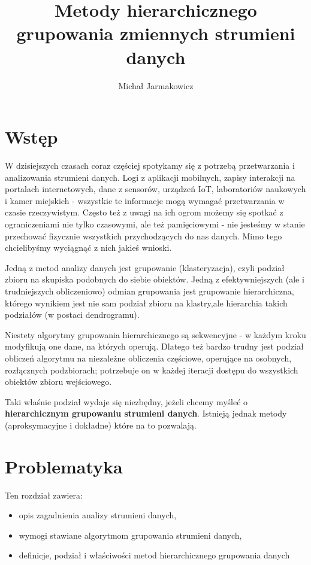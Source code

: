 \documentclass[11pt]{mgr}
\begin{document}
\author{Michał Jarmakowicz}
\title{ Metody hierarchicznego grupowania zmiennych strumieni danych}
\maketitle
\newpage
\tableofcontents
\newpage
\chapter{Wstęp}

W dzisiejszych czasach coraz częściej spotykamy się z potrzebą przetwarzania i analizowania strumieni danych. Logi z aplikacji mobilnych, zapisy interakcji na portalach internetowych, dane z sensorów, urządzeń IoT, laboratoriów naukowych i kamer miejskich - wszystkie te informacje mogą wymagać przetwarzania w czasie rzeczywistym. Często też z uwagi na ich ogrom możemy się spotkać z ograniczeniami nie tylko czasowymi, ale też pamięciowymi - nie jesteśmy w stanie przechować fizycznie wszystkich przychodzących do nas danych. Mimo tego chcielibyśmy wyciągnąć z nich jakieś wnioski.

Jedną z metod analizy danych jest grupowanie (klasteryzacja), czyli podział zbioru na skupiska podobnych do siebie obiektów. Jedną z efektywniejszych (ale i trudniejszych obliczeniowo) odmian grupowania jest grupowanie hierarchiczna, którego wynikiem jest nie sam podział zbioru na klastry,ale hierarchia takich podziałów (w postaci dendrogramu).

Niestety algorytmy grupowania hierarchicznego są sekwencyjne - w każdym kroku modyfikują one dane, na których operują. Dlatego też bardzo trudny jest podział obliczeń algorytmu na niezależne obliczenia częściowe, operujące na osobnych, rozłącznych podzbiorach; potrzebuje on w każdej iteracji dostępu do wszystkich obiektów zbioru wejściowego.

Taki właśnie podział wydaje się niezbędny, jeżeli chcemy myśleć o \textbf{hierarchicznym grupowaniu strumieni danych}. Istnieją jednak metody (aproksymacyjne i dokładne) które na to pozwalają.

\chapter{Problematyka}\label{problematyka}
Ten rozdział zawiera:
\begin{itemize}
\item opis zagadnienia analizy strumieni danych,
\item wymogi stawiane algorytmom grupowania strumieni danych,
\item definicje, podział i właściwości metod hierarchicznego grupowania danych
\end{itemize}
\end{document}
